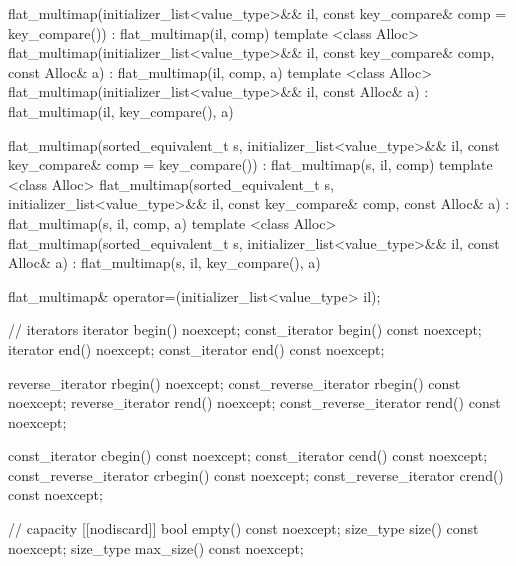 \begin{codeblock}
\begin{codeblock}
\begin{codeblock}
\begin{addedblock}
\begin{codeblock}
{{      flat_multimap(initializer_list<value_type>&& il,
                    const key_compare& comp = key_compare())
          : flat_multimap(il, comp) { }
      template <class Alloc>
        flat_multimap(initializer_list<value_type>&& il,
                      const key_compare& comp, const Alloc& a)
          : flat_multimap(il, comp, a) { }
      template <class Alloc>
        flat_multimap(initializer_list<value_type>&& il, const Alloc& a)
          : flat_multimap(il, key_compare(), a) { }

      flat_multimap(sorted_equivalent_t s, initializer_list<value_type>&& il,
                    const key_compare& comp = key_compare())
          : flat_multimap(s, il, comp) { }
      template <class Alloc>
        flat_multimap(sorted_equivalent_t s, initializer_list<value_type>&& il,
                      const key_compare& comp, const Alloc& a)
          : flat_multimap(s, il, comp, a) { }
      template <class Alloc>
        flat_multimap(sorted_equivalent_t s, initializer_list<value_type>&& il,
                      const Alloc& a)
          : flat_multimap(s, il, key_compare(), a) { }

      flat_multimap& operator=(initializer_list<value_type> il);

      // iterators
      iterator                begin() noexcept;
      const_iterator          begin() const noexcept;
      iterator                end() noexcept;
      const_iterator          end() const noexcept;

      reverse_iterator        rbegin() noexcept;
      const_reverse_iterator  rbegin() const noexcept;
      reverse_iterator        rend() noexcept;
      const_reverse_iterator  rend() const noexcept;

      const_iterator          cbegin() const noexcept;
      const_iterator          cend() const noexcept;
      const_reverse_iterator  crbegin() const noexcept;
      const_reverse_iterator  crend() const noexcept;

      // capacity
      [[nodiscard]] bool empty() const noexcept;
      size_type size() const noexcept;
      size_type max_size() const noexcept;

}}
\end{codeblock}
\end{addedblock}
\end{codeblock}
\end{codeblock}
\end{codeblock}
